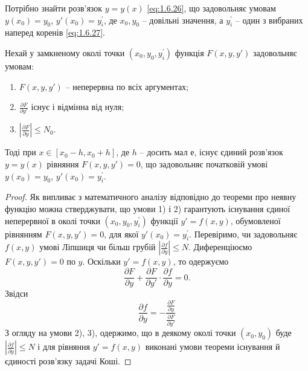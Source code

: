 Потрібно знайти розв’язок $y=y(x)$ \eqref{eq:1.6.26}, що задовольняє умовам $y(x_0)=y_0$, $y'(x_0)=y_i^\prime$, де $x_0,y_0$ -- довільні значення, а $y_i^\prime$ -- один з вибраних наперед коренів \eqref{eq:1.6.27}.

\begin{theorem}
	Нехай у замкненому околі точки $(x_0, y_0, y_i^\prime)$ функція $F(x,y,y')$ задовольняє умовам:
	\begin{enumerate}
		\item $F(x,y,y')$ -- неперервна по всіх аргументах;
		\item $\frac{\partial F}{\partial y'}$ існує і відмінна від нуля;
		\item $\left| \frac{\partial F}{\partial y}\right| \le N_0$.
	\end{enumerate}
	Тоді при $x \in [x_0 - h, x_0 + h]$, де $h$ -- досить мал е, існує єдиний розв’язок $y=y(x)$ рівняння $F(x, y, y') =0$, що задовольняє початковій умові $y(x_0)=y_0$, $y'(x_0)=y_i^\prime$.
\end{theorem}
\begin{proof}
	Як випливає з математичного аналізу відповідно до теореми про неявну функцію можна стверджувати, що умови 1) і 2) гарантують існування єдиної неперервної в околі точки $(x_0,y_0,y_i^\prime)$ функції $y'=f(x,y)$, обумовленої рівнянням $F(x,y,y')=0$, для якої $y'(x_0)=y_i^\prime$. Перевіримо, чи задовольняє $f(x,y)$ умові Ліпшиця чи більш грубій $\left|\frac{\partial f}{\partial y}\right| \le N$. Диференціюємо $F(x,y,y')=0$ по $y$. Оскільки $y'=f(x,y)$, то одержуємо
	\begin{equation}
		\label{eq:1.6.28}
		\frac{\partial F}{\partial y} + \frac{\partial F}{\partial y'} \cdot \frac{\partial f}{\partial y} = 0.
	\end{equation}
	Звідси
	\begin{equation}
		\label{eq:1.6.29}
		\frac{\partial f}{\partial y} = - \frac{\frac{\partial F}{\partial y}}{\frac{\partial F}{\partial y'}} 
	\end{equation} 
	З огляду на умови 2), 3), одержимо, що в деякому околі точки $(x_0,y_0)$ буде $\left|\frac{\partial f}{\partial y}\right| \le N$ і для рівняння $y'=f(x,y)$ виконані умови теореми існування й єдиності розв’язку задачі Коші.
\end{proof}
